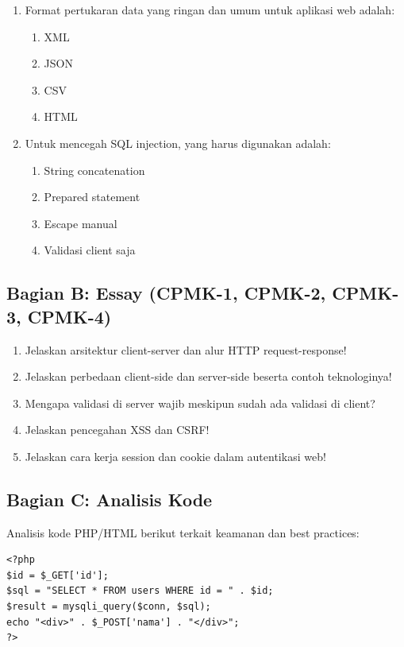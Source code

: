 \begin{enumerate}
\begin{enumerate}
  \end{enumerate}
  \item Format pertukaran data yang ringan dan umum untuk aplikasi web adalah:
  \begin{enumerate}
    \item XML \item JSON \item CSV \item HTML
  \end{enumerate}
  \item Untuk mencegah SQL injection, yang harus digunakan adalah:
  \begin{enumerate}
    \item String concatenation \item Prepared statement \item Escape manual \item Validasi client saja
  \end{enumerate}
\end{enumerate}

\subsection{Bagian B: Essay (CPMK-1, CPMK-2, CPMK-3, CPMK-4)}

\begin{enumerate}
  \item Jelaskan arsitektur client-server dan alur HTTP request-response!
  \item Jelaskan perbedaan client-side dan server-side beserta contoh teknologinya!
  \item Mengapa validasi di server wajib meskipun sudah ada validasi di client?
  \item Jelaskan pencegahan XSS dan CSRF!
  \item Jelaskan cara kerja session dan cookie dalam autentikasi web!
\end{enumerate}

\subsection{Bagian C: Analisis Kode}

Analisis kode PHP/HTML berikut terkait keamanan dan best practices:
\begin{lstlisting}[basicstyle=\ttfamily\footnotesize, frame=single]
<?php
$id = $_GET['id'];
$sql = "SELECT * FROM users WHERE id = " . $id;
$result = mysqli_query($conn, $sql);
echo "<div>" . $_POST['nama'] . "</div>";
?>
\end{lstlisting}

